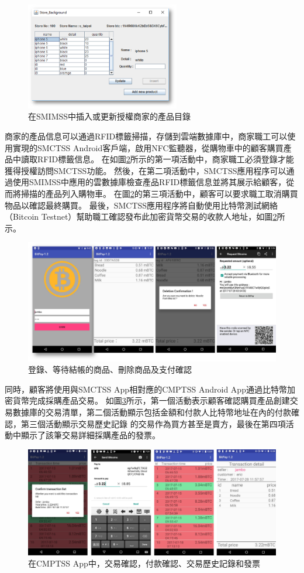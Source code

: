 \begin{figure}[!htbp]
	\centering
	\includegraphics[width = 0.6\textwidth]{fig6.png}
	\caption{在SMIMSS中插入或更新授權商家的產品目錄}\label{fig6}
\end{figure}

商家的產品信息可以通過RFID標籤掃描，存儲到雲端數據庫中，商家職工可以使用實現的SMCTSS Android客戶端，啟用NFC監聽器，從購物車中的顧客購買產品中讀取RFID標籤信息。 在如圖\ref{fig7}所示的第一項活動中，商家職工必須登錄才能獲得授權訪問SMCTSS功能。 然後，在第二項活動中，SMCTSS應用程序可以通過使用SMIMSS中應用的雲數據庫檢查產品RFID標籤信息並將其展示給顧客，從而將掃描的產品列入購物車。 在圖\ref{fig7}的第三項活動中，顧客可以要求職工取消購買物品以確認最終購買。 最後，SMCTSS應用程序將自動使用比特幣測試網絡（Bitcoin Testnet）\supercite{bitcointestnet}幫助職工確認發布此加密貨幣交易的收款人地址，如圖\ref{fig7}所示。    

\begin{figure}[!htbp]
	\centering
	\includegraphics[width = 1\textwidth]{fig7.png}
	\caption{登錄、等待結帳的商品、刪除商品及支付確認}\label{fig7}
\end{figure}

同時，顧客將使用與SMCTSS App相對應的CMPTSS Android App通過比特幣加密貨幣完成採購產品交易。 如圖\ref{fig8}所示，第一個活動表示顧客確認購買產品創建交易數據庫的交易清單，第二個活動顯示包括金額和付款人比特幣地址在內的付款確認，第三個活動顯示交易歷史記錄 的交易作為買方甚至是賣方，最後在第四項活動中顯示了該筆交易詳細採購產品的發票。    

\begin{figure}[!htbp]
	\centering
	\includegraphics[width = 1\textwidth]{fig8.png}
	\caption{在CMPTSS App中，交易確認，付款確認、交易歷史記錄和發票}\label{fig8}
\end{figure}
